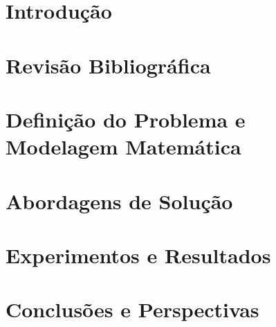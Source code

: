 \documentclass[mestrado, pre-defesa]{packages/icmc}
\begin{document}
\textual

\chapter{Introdução} %


\chapter{Revisão Bibliográfica} %


\chapter{Definição do Problema e Modelagem Matemática} %


\chapter{Abordagens de Solução} %


\chapter{Experimentos e Resultados} %


\chapter{Conclusões e Perspectivas} %



% 

\postextual



\end{document}
